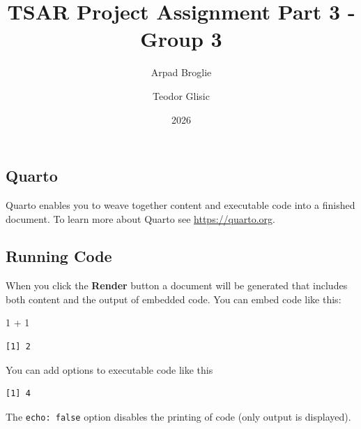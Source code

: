 \documentclass[
  letterpaper,
  DIV=11,
  numbers=noendperiod]{scrartcl}
\title{TSAR Project Assignment Part 3 - Group 3}
\author{Arpad Broglie \and Teodor Glisic}
\date{2026}
\newenvironment{Shaded}{\begin{snugshade}}{\end{snugshade}}
\newcommand{\DecValTok}[1]{\textcolor[rgb]{0.68,0.00,0.00}{#1}}
\newcommand{\SpecialCharTok}[1]{\textcolor[rgb]{0.37,0.37,0.37}{#1}}
\renewcommand*\contentsname{Table of contents}
\newcommand\contentsname{Table of contents}
\begin{document}
\maketitle

\renewcommand*\contentsname{Table of contents}
{
\setcounter{tocdepth}{3}
\tableofcontents
}

\subsection{Quarto}\label{quarto}

Quarto enables you to weave together content and executable code into a
finished document. To learn more about Quarto see
\url{https://quarto.org}.

\subsection{Running Code}\label{running-code}

When you click the \textbf{Render} button a document will be generated
that includes both content and the output of embedded code. You can
embed code like this:

\begin{Shaded}
\begin{Highlighting}[]
\DecValTok{1} \SpecialCharTok{+} \DecValTok{1}
\end{Highlighting}
\end{Shaded}

\begin{verbatim}
[1] 2
\end{verbatim}

You can add options to executable code like this

\begin{verbatim}
[1] 4
\end{verbatim}

The \texttt{echo:\ false} option disables the printing of code (only
output is displayed).
\end{document}
